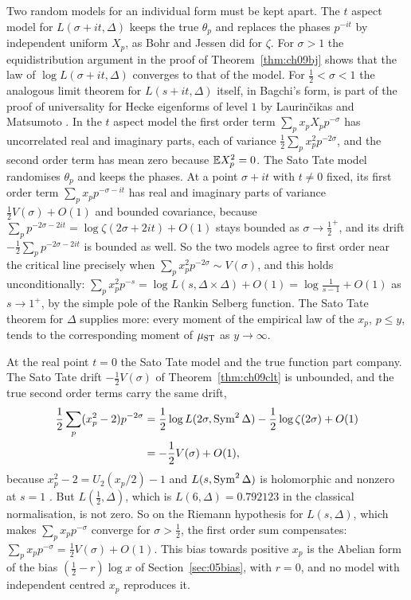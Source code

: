 Two random models for an individual form must be kept apart. The $t$ aspect model for $L(\sigma+it,\Delta)$ keeps the true $\theta_p$ and replaces the phases $p^{-it}$ by independent uniform $X_p$, as Bohr and Jessen did for $\zeta$. For $\sigma>1$ the equidistribution argument in the proof of Theorem~\ref{thm:ch09bj} shows that the law of $\log L(\sigma+it,\Delta)$ converges to that of the model. For $\frac12<\sigma<1$ the analogous limit theorem for $L(s+it,\Delta)$ itself, in Bagchi's form, is part of the proof of universality for Hecke eigenforms of level $1$ by Laurin\v{c}ikas and Matsumoto \cite{laurincikasmatsumoto2001}. In the $t$ aspect model the first order term $\sum_px_pX_pp^{-\sigma}$ has uncorrelated real and imaginary parts, each of variance $\frac12\sum_px_p^2p^{-2\sigma}$, and the second order term has mean zero because $\mathbb{E} X_p^2 = 0$. The Sato Tate model randomises $\theta_p$ and keeps the phases. At a point $\sigma+it$ with $t\ne0$ fixed, its first order term $\sum_px_pp^{-\sigma-it}$ has real and imaginary parts of variance $\frac12V(\sigma)+O(1)$ and bounded covariance, because $\sum_pp^{-2\sigma-2it} = \log\zeta(2\sigma+2it)+O(1)$ stays bounded as $\sigma\to\frac12^+$, and its drift $-\frac12\sum_pp^{-2\sigma-2it}$ is bounded as well. So the two models agree to first order near the critical line precisely when $\sum_px_p^2p^{-2\sigma}\sim V(\sigma)$, and this holds unconditionally: $\sum_px_p^2p^{-s} = \log L(s,\Delta\times\Delta)+O(1) = \log\frac1{s-1}+O(1)$ as $s\to1^+$, by the simple pole of the Rankin Selberg function. The Sato Tate theorem for $\Delta$ \cite{blght2011} supplies more: every moment of the empirical law of the $x_p$, $p\le y$, tends to the corresponding moment of $\mu_{\mathrm{ST}}$ as $y\to\infty$.

At the real point $t=0$ the Sato Tate model and the true function part company. The Sato Tate drift $-\frac12V(\sigma)$ of Theorem~\ref{thm:ch09clt} is unbounded, and the true second order terms carry the same drift,
\begin{align*}
\frac12\sum_p(x_p^2-2)p^{-2\sigma} &= \frac12\log L(2\sigma,\operatorname{Sym}^2\Delta)-\frac12\log\zeta(2\sigma)+O(1)\\
&= -\frac12V(\sigma)+O(1),
\end{align*}
because $x_p^2-2 = U_2(x_p/2)-1$ and $L(s,\operatorname{Sym}^2\Delta)$ is holomorphic and nonzero at $s=1$ \cite{gelbartjacquet1978,jacquetshalika1976}. But $L(\frac12,\Delta)$, which is $L(6,\Delta) = 0.792123$ in the classical normalisation, is not zero. So on the Riemann hypothesis for $L(s,\Delta)$, which makes $\sum_px_pp^{-\sigma}$ converge for $\sigma>\frac12$, the first order sum compensates: $\sum_px_pp^{-\sigma} = \frac12V(\sigma)+O(1)$. This bias towards positive $x_p$ is the Abelian form of the bias $(\frac12-r)\log x$ of Section~\ref{sec:05bias}, with $r=0$, and no model with independent centred $x_p$ reproduces it.

